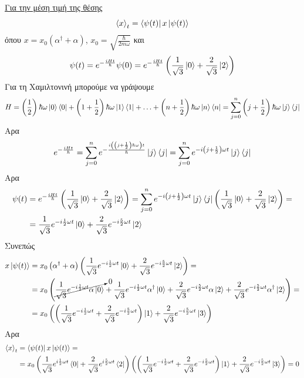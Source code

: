 \documentclass[12pt]{article}
\begin{document}
\section*{{}}
\underline{Για την μέση τιμή της θέσης} \\
$$\braket{x}_t = \bra{\psi(t)}x \ket{\psi(t)} $$
όπου $x = x_0(\alpha^\dag+\alpha)$, $x_0 = \sqrt{\frac{\hbar}{2m\omega}}$ και 
$$ \psi(t) =e^{-\frac{iHt}{\hbar}}\psi(0) = e^{-\frac{iHt}{\hbar}}\left(\frac{1}{\sqrt{3}}\ket{0}+\frac{2}{\sqrt{3}}\ket{2}\right)$$
Για τη Χαμιλτονινή μπορούμε να γράψουμε 
$$H = \left(\frac{1}{2}\right)\hbar\omega\ket{0}\bra{0}+\left(1+\frac{1}{2}\right)\hbar\omega\ket{1}\bra{1}+\hdots+\left(n+\frac{1}{2}\right)\hbar\omega\ket{n}\bra{n} = \sum_{j=0}^n\left(j+\frac{1}{2}\right)\hbar\omega\ket{j}\bra{j}$$
Αρα
$$e^{-\frac{iHt}{\hbar}} = \sum_{j=0}^n e^{-\frac{i\left(\left(j+\frac{1}{2}\right)\hbar\omega\right)t}{\hbar}}\ket{j}\bra{j} =  \sum_{j=0}^n e^{-i\left(j+\frac{1}{2}\right)\omega t}\ket{j}\bra{j}$$
Αρα 
\begin{align*}
\psi(t) &= e^{-\frac{iHt}{\hbar}}\left(\frac{1}{\sqrt{3}}\ket{0}+\frac{2}{\sqrt{3}}\ket{2}\right) = \sum_{j=0}^n e^{-i\left(j+\frac{1}{2}\right)\omega t}\ket{j}\bra{j}\left(\frac{1}{\sqrt{3}}\ket{0}+\frac{2}{\sqrt{3}}\ket{2}\right) =\\
&=\frac{1}{\sqrt{3}}e^{-i\frac{1}{2}\omega t}\ket{0}+\frac{2}{\sqrt{3}}e^{-i\frac{5}{2}\omega t}\ket{2}
\end{align*}
Συνεπώς 
\begin{align*}
    x\ket{\psi(t)} &= x_0\left(\alpha^\dag +\alpha \right)\left(\frac{1}{\sqrt{3}}e^{-i\frac{1}{2}\omega t}\ket{0}+\frac{2}{\sqrt{3}}e^{-i\frac{5}{2}\omega t}\ket{2}\right) =  \\
    &=x_0\left(\cancelto{0}{\frac{1}{\sqrt{3}}e^{-i\frac{1}{2}\omega t}\alpha\ket{0}} + \frac{1}{\sqrt{3}}e^{-i\frac{1}{2}\omega t}\alpha^\dag\ket{0}+\frac{2}{\sqrt{3}}e^{-i\frac{5}{2}\omega t}\alpha\ket{2}+\frac{2}{\sqrt{3}}e^{-i\frac{5}{2}\omega t}\alpha^\dag\ket{2}\right)=\\
    &= x_0\left(\left(\frac{1}{\sqrt{3}}e^{-i\frac{1}{2}\omega t}+\frac{2}{\sqrt{3}}e^{-i\frac{5}{2}\omega t}\right)\ket{1} + \frac{2}{\sqrt{3}}e^{-i\frac{5}{2}\omega t}\ket{3}\right)
\end{align*}
Αρα 
\begin{align*}
    \braket{x}_t &= \bra{\psi(t)}x\ket{\psi(t)} =\\
    &= x_0\left(\frac{1}{\sqrt{3}}e^{i\frac{1}{2}\omega t}\bra{0}+\frac{2}{\sqrt{3}}e^{i\frac{5}{2}\omega t}\bra{2}\right)\left(\left(\frac{1}{\sqrt{3}}e^{-i\frac{1}{2}\omega t}+\frac{2}{\sqrt{3}}e^{-i\frac{5}{2}\omega t}\right)\ket{1} + \frac{2}{\sqrt{3}}e^{-i\frac{5}{2}\omega t}\ket{3}\right)=0   
\end{align*}\\
\end{document}
